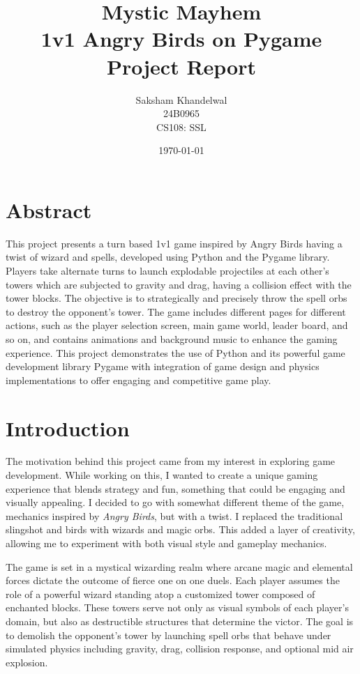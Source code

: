 \documentclass[10.5pt]{article}
\title{\Huge\textbf{Mystic Mayhem} \\ \Large{1v1 Angry Birds on Pygame} \\ \vspace{0.5cm} \large Project Report}
\author{Saksham Khandelwal \\ 24B0965 \\ CS108: SSL}
\date{\today}
\begin{document}
\thispagestyle{empty}
\maketitle

\tableofcontents
\newpage

\section{Abstract}
This project presents a turn based 1v1 game inspired by Angry Birds having a twist of wizard and spells, developed using Python and the Pygame library. Players take alternate turns to launch explodable projectiles at each other's towers which are subjected to gravity and drag, having a collision effect with the tower blocks. The objective is to strategically and precisely throw the spell orbs to destroy the opponent's tower. The game includes different pages for different actions, such as the player selection screen, main game world, leader board, and so on, and contains animations and background music to enhance the gaming experience. This project demonstrates the use of Python and its powerful game development library Pygame with integration of game design and physics implementations to offer engaging and competitive game play. \\

\section{Introduction}

The motivation behind this project came from my interest in exploring game development. While working on this, I wanted to create a unique gaming experience that blends strategy and fun, something that could be engaging and visually appealing. I decided to go with somewhat different theme of the game, mechanics inspired by \textit{Angry Birds}, but with a twist. I replaced the traditional slingshot and birds with wizards and magic orbs. This added a layer of creativity, allowing me to experiment with both visual style and gameplay mechanics.

The game is set in a mystical wizarding realm where arcane magic and elemental forces dictate the outcome of fierce one on one duels. Each player assumes the role of a powerful wizard standing atop a customized tower composed of enchanted blocks. These towers serve not only as visual symbols of each player's domain, but also as destructible structures that determine the victor. The goal is to demolish the opponent’s tower by launching spell orbs that behave under simulated physics including gravity, drag, collision response, and optional mid air explosion.
\end{document}
